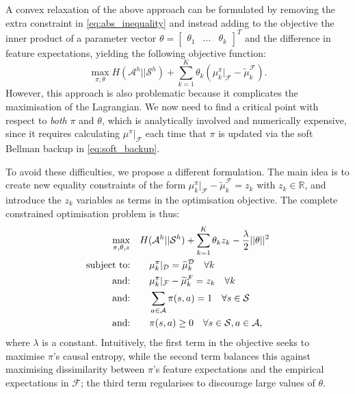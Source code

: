 \documentclass{aamas2016}
\newcommand{\sw}[1]{\textcolor{red}{SW: #1}}
\newcommand{\jm}[1]{\textcolor{blue}{Joao: #1}}
\newcommand{\sw}[1]{}
\newcommand{\jm}[1]{}
\begin{document}
A convex relaxation of the above approach can be formulated by removing the extra constraint in \eqref{eq:abs_inequality} and instead adding to the objective the inner product of a parameter vector $\theta=\left[\begin{array}{ccc}\theta_1 & \ldots & \theta_k\end{array}\right]^T$ and the difference in feature expectations, yielding the following objective function:
	\begin{equation}
		\max\limits_{\pi,\theta} H(\mathcal{A}^h||\mathcal{S}^h) + \sum^K_{k=1} \theta_k (\mu^{\pi}_k|_{\mathcal{F}} - \widetilde{\mu}^{\mathcal{F}}_k).
	\end{equation}
However, this approach is also problematic because it complicates the maximisation of the Lagrangian. We now need to find a critical point with respect to \emph{both} $\pi$ and $\theta$, which is analytically involved and numerically expensive, since it requires calculating $\mu^{\pi}|_{\mathcal{F}}$ each time that $\pi$ is updated via the soft Bellman backup in \eqref{eq:soft_backup}.

To avoid these difficulties, we propose a different formulation.  The main idea is to create new equality constraints of the form $\mu_k^{\pi}|_{\mathcal{F}} -\widetilde{\mu}_k^{\mathcal{F}}=z_k$ with $z_k\in\mathbb R$, and introduce the $z_k$ variables as terms in the optimisation objective.  The complete constrained optimisation problem is thus:
\begin{align}
 \quad\max\limits_{\pi,\theta,z}&\quad H(\mathcal{A}^h||\mathcal{S}^h) + \sum_{k=1}^K \theta_k z_k - \frac{\lambda}{2}||\mathbf{\theta}||^2 \label{eq:primal_obj_failure}\\
\hbox{subject to:}&\quad \quad\mu^{\pi}_k|_{\mathcal{D}}=\widetilde{\mu}^{\mathcal{D}}_k\quad\forall k \label{eq:features_equality_constraint_failure}\\
\hbox{and:}&\quad \quad  \mu_k^{\pi}|_{\mathcal{F}} -\widetilde{\mu}_k^{\mathcal{F}}=z_k \quad \forall k\\
\hbox{and:}&\quad \quad\sum_{a\in\mathcal{A}}\pi(s,a)  = 1\quad\forall s\in\mathcal{S}\\
\hbox{and:}&\quad \quad\pi(s,a) \geq 0\quad\forall s\in\mathcal{S},a\in\mathcal{A},  
\end{align}
where $\lambda$ is a constant.  
Intuitively, the first term in the objective seeks to maximise $\pi$'s causal entropy, while the second term balances this against maximising dissimilarity between $\pi$'s feature expectations and the empirical expectations in $\mathcal{F}$; the third term regularises to discourage large values of $\theta$.
\end{document}
